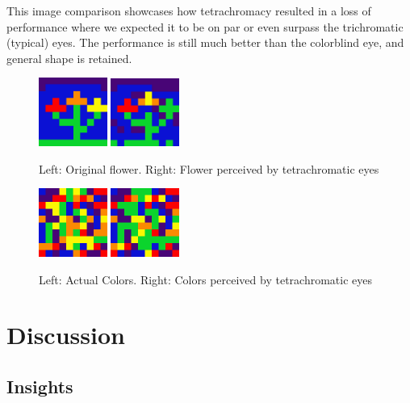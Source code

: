 \documentclass[titlepage]{article}
\begin{document}
This image comparison showcases how tetrachromacy resulted in a loss of performance where we expected it to be on par or even surpass the trichromatic (typical) eyes. The performance is still much better than the colorblind eye, and general shape is retained.

\begin{figure}[H]
    \centering
    \includegraphics[width=0.2\textwidth]{figs/original_flower.png}
    \includegraphics[width=0.2\textwidth]{figs/flower_tetra.png}
    \caption{Left: Original flower. Right: Flower perceived by tetrachromatic eyes}
\end{figure}

\begin{figure}[H]
    \centering
    \includegraphics[width=0.2\textwidth]{figs/tetrachromatic_actual_results.png}
    \includegraphics[width=0.2\textwidth]{figs/tetrachromatic_predicted_results.png}
    \caption{Left: Actual Colors. Right: Colors perceived by tetrachromatic eyes}
\end{figure}

\section{Discussion}

\subsection{Insights}
\end{document}
